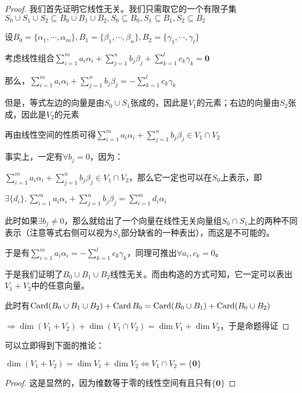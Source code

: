 \documentclass[12pt, a4paper, oneside, UTF8]{ctexbook}
\begin{document}
\begin{para}{0}
\begin{proof}
						我们首先证明它线性无关。我们只需取它的一个有限子集$S_0 \cup S_1 \cup S_2 \subseteq B_0 \cup B_1 \cup B_2,S_0 \subseteq B_0,S_1 \subseteq B_1,S_2 \subseteq B_2$
					
						设$B_0 = \{\alpha_1,\cdots,\alpha_m\},B_1 = \{\beta_1,\cdots,\beta_n\},B_2=\{\gamma_1,\cdots,\gamma_l\}$

						考虑线性组合$\sum\limits_{i=1}^{m} a_i \alpha_i +\sum\limits_{j=1}^{n} b_j \beta_j +\sum\limits_{k=1}^{l} c_k \gamma_k = \mathbf{0}$
					
						那么，$\sum\limits_{i=1}^{m} a_i \alpha_i +\sum\limits_{j=1}^{n} b_j \beta_j = - \sum\limits_{k=1}^{l} c_k \gamma_k$

						但是，等式左边的向量是由$S_0 \cup S_1$张成的，因此是$V_1$的元素；右边的向量由$S_2$张成，因此是$V_2$的元素

						再由线性空间的性质可得$\sum\limits_{i=1}^{m} a_i \alpha_i +\sum\limits_{j=1}^{n} b_j \beta_j \in V_1 \cap V_2$
					
						事实上，一定有$\forall b_j = 0$，因为：

						$\sum\limits_{i=1}^{m} a_i \alpha_i +\sum\limits_{j=1}^{n} b_j \beta_j \in V_1 \cap V_2$，那么它一定也可以在$S_0$上表示，即

						$\exists \{d_i\},\sum\limits_{i=1}^{m} a_i \alpha_i +\sum\limits_{j=1}^{n} b_j \beta_j=\sum\limits_{i=1}^{m} d_i \alpha_i$

						此时如果$\exists b_j \neq 0$，那么就给出了一个向量在线性无关向量组$S_0 \cap S_1$上的两种不同表示（注意等式右侧可以视为$S_1$部分缺省的一种表出），而这是不可能的。

						于是有$\sum\limits_{i=1}^{m} a_i \alpha_i = - \sum\limits_{k=1}^{l} c_k \gamma_k$，同理可推出$\forall a_i,c_k = 0$。

						于是我们证明了$B_0 \cup B_1 \cup B_2$线性无关。而由构造的方式可知，它一定可以表出$V_1+V_2$中的任意向量。

						此时有$\operatorname{Card} (B_0 \cup B_1 \cup B_2) + \operatorname{Card} B_0 = \operatorname{Card} (B_0 \cup B_1) + \operatorname{Card} (B_0 \cup B_2)$

						$\Rightarrow \dim (V_1+V_2) + \dim (V_1 \cap V_2) = \dim V_1 + \dim V_2$，于是命题得证
					\end{proof}
					可以立即得到下面的推论：
					\begin{corollary}{}{}
						$\dim (V_1+V_2)=\dim V_1+\dim V_2 \Leftrightarrow V_1 \cap V_2 = \{\mathbf{0}\}$
					\end{corollary}
					\begin{proof}
						这是显然的，因为维数等于零的线性空间有且只有$\{\mathbf{0}\}$
					\end{proof}
			\end{para}
\end{document}
